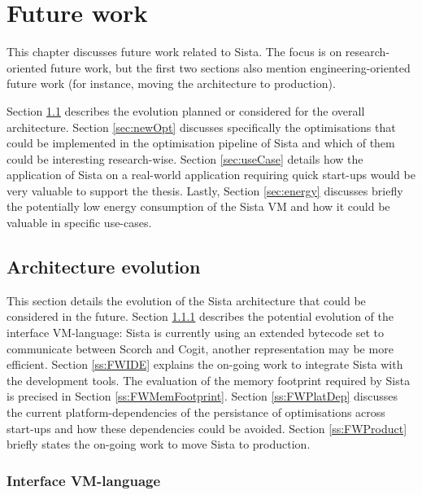 \documentclass[a4paper,12pt,twoside]{../includes/ThesisStyle}
\begin{document}
\fi

\chapter{Future work}
\label{chap:futureWork}
\minitoc

This chapter discusses future work related to Sista. The focus is on research-oriented future work, but the first two sections also mention engineering-oriented future work (for instance, moving the architecture to production).

Section \ref{sec:archEvo} describes the evolution planned or considered for the overall architecture. Section \ref{sec:newOpt} discusses specifically the optimisations that could be implemented in the optimisation pipeline of Sista and which of them could be interesting research-wise. Section \ref{sec:useCase} details how the application of Sista on a real-world application requiring quick start-ups would be very valuable to support the thesis. Lastly, Section \ref{sec:energy} discusses briefly the potentially low energy consumption of the Sista VM and how it could be valuable in specific use-cases.

\section{Architecture evolution}
\label{sec:archEvo}

This section details the evolution of the Sista architecture that could be considered in the future. Section \ref{ss:FWInterface} describes the potential evolution of the interface VM-language: Sista is currently using an extended bytecode set to communicate between Scorch and Cogit, another representation may be more efficient. Section \ref{ss:FWIDE} explains the on-going work to integrate Sista with the development tools. The evaluation of the memory footprint required by Sista is precised in Section \ref{ss:FWMemFootprint}. Section \ref{ss:FWPlatDep} discusses the current platform-dependencies of the persistance of optimisations across start-ups and how these dependencies could be avoided. Section \ref{ss:FWProduct} briefly states the on-going work to move Sista to production.

\subsection{Interface VM-language}
\label{ss:FWInterface}
\end{document}
